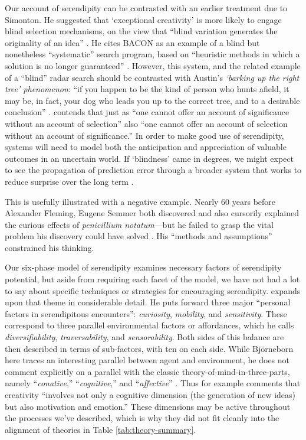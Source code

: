 Our account of serendipity can be contrasted with an earlier treatment due to Simonton.  
He suggested that `exceptional
creativity' is more likely to engage blind selection mechanisms, on
the view that ``blind variation generates the originality of an
idea'' \citet[p.~158]{simonton2010creative}.  He cites {\sf BACON} \cite{langley1987scientific} as an
example of a blind but nonetheless ``systematic'' search program,
based on ``heuristic methods in which a solution is no longer
guaranteed'' \cite[p.~169]{simonton2010creative}.  However, this
system, and the related example of a ``blind'' radar search
\cite[p.~383]{campbell1960blind} should be contrasted with Austin's
\emph{`barking up the right tree' phenomenon}: ``if you happen to be
the kind of person who hunts afield, it may be, in fact, your dog who
leads you up to the correct tree, and to a desirable conclusion''
\cite[p.~50]{austin1978chase}.
\citet[p.~720]{kockelman2011biosemiosis} contends that just as ``one
cannot offer an account of significance without an account of
selection'' also ``one cannot offer an account of selection without an
account of significance.''  In order to make good use of serendipity,
systems will need to model both the anticipation and appreciation of
valuable outcomes in an uncertain world.
If `blindness' came in degrees, we might expect to see the
propagation of prediction error through a broader system that works to
reduce surprise over the long term \cite{Kiverstein2017,Friston2012}.

This is usefully illustrated with a negative example.  Nearly 60 years
before Alexander Fleming, Eugene Semmer both discovered and also
cursorily explained the curious effects of \emph{penicillium
  notatum}---but he failed to grasp the vital problem his discovery
could have solved \cite[p.~75]{cropley2013creativity}.  His ``methods
and assumptions'' \cite[p.~131]{floppyearedrabbits1958barber}
constrained his thinking.

Our six-phase model of serendipity examines necessary factors of serendipity
potential, but aside from requiring each facet of the model, we have
not had a lot to say about specific techniques or strategies for
encouraging serendipity.  \citet{bjorneborn2017three} expands upon
that theme in considerable detail.  He puts forward three major
``personal factors in serendipitous encounters'': \emph{curiosity},
\emph{mobility}, and \emph{sensitivity}.  These correspond to three
parallel environmental factors or affordances, which he calls
\emph{diversifiability}, \emph{traversability}, and
\emph{sensorability}.  Both sides of this balance are then described
in terms of sub-factors, with ten on each side.  While Bj\"orneborn
here traces an interesting parallel between agent and environment, he
does not comment explicitly on a parallel with the classic theory-of-mind-in-three-parts, namely ``\emph{conative},''
``\emph{cognitive},'' and ``\emph{affective}''
\cite{hilgard1980trilogy}.
Thus for example \citet[p.~347]{boden1998creativity} comments that
creativity ``involves not only a cognitive dimension (the generation
of new ideas) but also motivation and emotion.''
These dimensions may be active throughout the processes we've
described, which is why they did not fit cleanly into the alignment of
theories in Table \ref{tab:theory-summary}.

